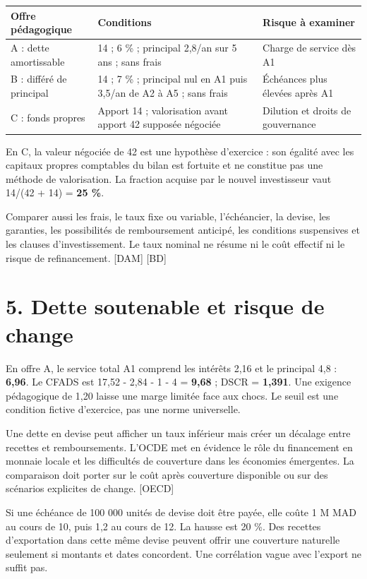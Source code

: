 \documentclass[12pt,a4paper]{article}
\begin{document}
\Needspace{180pt}
\begin{longtable}{p{5.07cm}p{5.07cm}p{5.07cm}}
\toprule
Offre pédagogique & Conditions & Risque à examiner \\
\midrule\endhead
A : dette amortissable & 14 ; 6 \% ; principal 2,8/an sur 5 ans ; sans frais & Charge de service dès A1 \\
B : différé de principal & 14 ; 7 \% ; principal nul en A1 puis 3,5/an de A2 à A5 ; sans frais & Échéances plus élevées après A1 \\
C : fonds propres & Apport 14 ; valorisation avant apport 42 supposée négociée & Dilution et droits de gouvernance \\
\bottomrule
\end{longtable}

En C, la valeur négociée de 42 est une hypothèse d’exercice : son égalité avec les capitaux propres comptables du bilan est fortuite et ne constitue pas une méthode de valorisation. La fraction acquise par le nouvel investisseur vaut 14/(42 + 14) = \textbf{25 \%}.


Comparer aussi les frais, le taux fixe ou variable, l’échéancier, la devise, les garanties, les possibilités de remboursement anticipé, les conditions suspensives et les clauses d’investissement. Le taux nominal ne résume ni le coût effectif ni le risque de refinancement. [DAM] [BD]

\section*{5. Dette soutenable et risque de change}
En offre A, le service total A1 comprend les intérêts 2,16 et le principal 4,8 : \textbf{6,96}. Le CFADS est 17,52 - 2,84 - 1 - 4 = \textbf{9,68} ; DSCR = \textbf{1,391}. Une exigence pédagogique de 1,20 laisse une marge limitée face aux chocs. Le seuil est une condition fictive d’exercice, pas une norme universelle.


Une dette en devise peut afficher un taux inférieur mais créer un décalage entre recettes et remboursements. L’OCDE met en évidence le rôle du financement en monnaie locale et les difficultés de couverture dans les économies émergentes. La comparaison doit porter sur le coût après couverture disponible ou sur des scénarios explicites de change. [OECD]


Si une échéance de 100 000 unités de devise doit être payée, elle coûte 1 M MAD au cours de 10, puis 1,2 au cours de 12. La hausse est 20 \%. Des recettes d’exportation dans cette même devise peuvent offrir une couverture naturelle seulement si montants et dates concordent. Une corrélation vague avec l’export ne suffit pas.
\end{document}
